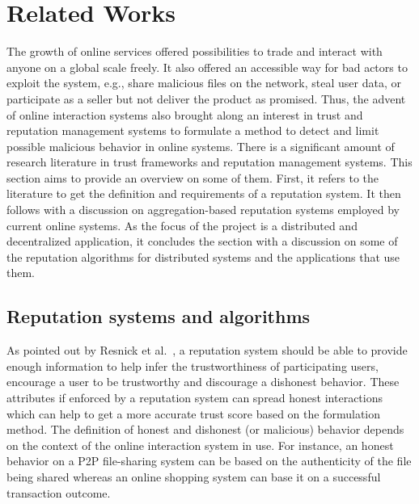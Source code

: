 \chapter{Related Works}\label{ch:litrev}
The growth of online services offered possibilities to trade and interact with
anyone on a global scale freely. It also offered an accessible way for bad
actors to exploit the system, e.g., share malicious files on the network, steal
user data, or participate as a seller but not deliver the product as promised.
Thus, the advent of online interaction systems also brought along an interest
in trust and reputation management systems to formulate a method to detect and
limit possible malicious behavior in online systems. There is a significant
amount of research literature in trust frameworks and reputation management
systems. This section aims to provide an overview on some of them. First, it
refers to the literature to get the definition and requirements of a reputation
system. It then follows with a discussion on aggregation-based reputation
systems employed by current online systems. As the focus of the project is a
distributed and decentralized application, it concludes the section with a
discussion on some of the reputation algorithms for distributed systems and the
applications that use them.

\section{Reputation systems and algorithms} \label{litrev:reptationalgorithms}
As pointed out by Resnick et al.~\cite{resnick2000reputation}, a reputation
system should be able to provide enough information to help infer the
trustworthiness of participating users, encourage a user to be trustworthy and
discourage a dishonest behavior. These attributes if enforced by a reputation
system can spread honest interactions which can help to get a more accurate
trust score based on the formulation method. The definition of honest and
dishonest (or malicious) behavior depends on the context of the online
interaction system in use. For instance, an honest behavior on a P2P
file-sharing system can be based on the authenticity of the file being shared
whereas an online shopping system can base it on a successful transaction
outcome. \par 


